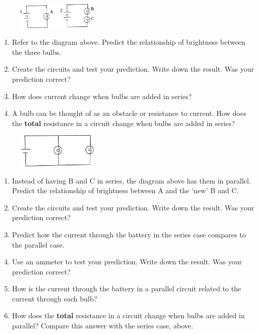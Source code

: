 \documentclass{article}
\begin{document}
\begin{figure}[h]
  \centering
  \includegraphics[width=1.5in]{4.png}
\end{figure}
\begin{enumerate}[resume]
  \item Refer to the diagram above. Predict the relationship of brightness between the three bulbs.
  \item Create the circuits and test your prediction. Write down the result. Was your prediction correct?
  \item How does current change when bulbs are added in series?
  \item A bulb can be thought of as an obstacle or resistance to current. How does the \textbf{total} resistance in a circuit change when bulbs are added in series?
\end{enumerate}
\begin{figure}[h]
  \centering
  \includegraphics[width=1.5in]{5.png}
\end{figure}
\begin{enumerate}[resume]
  \item Instead of having B and C in series, the diagram above has them in parallel. Predict the relationship of brightness between A and the `new' B and C.
  \item Create the circuits and test your prediction. Write down the result. Was your prediction correct?
  \item Predict how the current through the battery in the series case compares to the parallel case.
  \item Use an ammeter to test your prediction. Write down the result. Was your prediction correct?
  \item How is the current through the battery in a parallel circuit related to the current through each bulb?
  \item How does the \textbf{total} resistance in a circuit change when bulbs are added in parallel? Compare this answer with the series case, above.
\end{enumerate}
\end{document}
